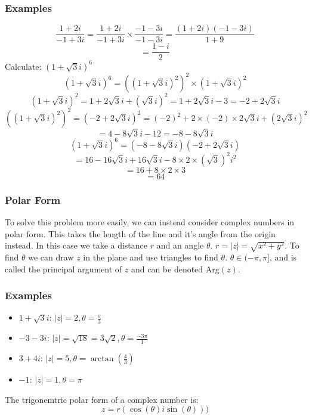 \documentclass[12pt]{report}
\begin{document}
\begin{flushleft}
\subsubsection*{Examples}
\[\frac{1 + 2i}{-1 + 3i} = \frac{1 + 2i}{-1 + 3i} \times \frac{-1 - 3i}{-1 - 3i} = \frac{(1 + 2i)(-1 - 3i)}{1 + 9}\]
\[=\frac{1 - i}{2}\]
Calculate: \((1 + \sqrt{3}i)^6\)
\[(1 + \sqrt{3}i)^6 = ((1 + \sqrt{3}i)^2)^2 \times (1 + \sqrt{3}i)^2\]
\[(1 + \sqrt{3}i)^2 = 1 + 2\sqrt{3}i + (\sqrt{3}i)^2 = 1 + 2\sqrt{3}i - 3 = -2 + 2\sqrt{3}i\]
\[((1 + \sqrt{3}i)^2)^2 = (-2 + 2\sqrt{3}i)^2 = (-2)^2 + 2 \times (-2) \times 2\sqrt{3}i + (2\sqrt{3}i)^2\]
\[= 4 - 8\sqrt{3}i - 12 = -8 - 8 \sqrt{3}i\]
\[(1 + \sqrt{3}i)^6 = (-8 -8\sqrt{3}i)(-2 + 2\sqrt{3}i)\]
\[= 16 - 16\sqrt{3}i + 16\sqrt{3}i - 8 \times 2 \times (\sqrt{3})^2i^2\]
\[= 16 + 8 \times 2 \times 3\]
\[= 64\]

\subsubsection*{Polar Form}
To solve this problem more easily, we can instead consider complex numbers in polar form.
This takes the length of the line and it's angle from the origin instead. In this case we 
take a distance \(r\) and an angle \(\theta\). \(r = |z| = \sqrt{x^2 + y^2}\). To find \(\theta\)
we can draw \(z\) in the plane and use triangles to find \(\theta\). \(\theta \in (-\pi, \pi]\), and
is called the principal argument of \(z\) and can be denoted \(\mathrm{Arg}(z)\).

\subsubsection*{Examples}
\begin{itemize}
    \item \(1 + \sqrt{3}i\): \(|z| = 2, \theta = \frac{\pi}{3}\)
    \item \(-3 - 3i\): \(|z| = \sqrt{18} = 3\sqrt{2}, \theta = \frac{-3\pi}{4}\)
    \item \(3 + 4i\): \(|z| = 5, \theta = \arctan(\frac{4}{3})\)
    \item \(-1\): \(|z| = 1, \theta = \pi\)
\end{itemize}

The trigonemtric polar form of a complex number is:
\[z = r(\cos(\theta) i\sin(\theta)))\]

\end{flushleft}
\end{document}
